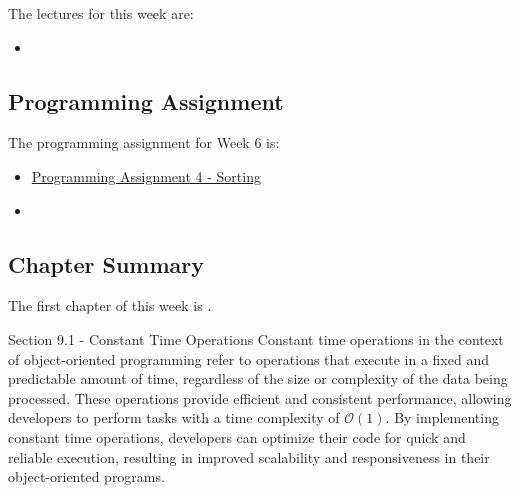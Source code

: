 \noindent The lectures for this week are:

\begin{itemize}
    \item {}
\end{itemize}

\subsection{Programming Assignment}

The programming assignment for Week 6 is:

\begin{itemize}
    \item \href{https://github.com/QuantumCompiler/CU/tree/main/CSPB%202270%20-%20Data%20Structures/CSPB%202270%20-%20Programming%20Assignments/CSPB%202270%20-%20Assignment%204%20-%20Sorting%20Algorithms}{Programming Assignment 4 - Sorting}
    \item {}
\end{itemize}

\subsection{Chapter Summary}

The first chapter of this week is .

\begin{notes}{Section 9.1 - Constant Time Operations}
    Constant time operations in the context of object-oriented programming refer to operations that execute in a fixed and predictable amount of time, regardless of the size or complexity of the data being processed. These operations provide efficient and consistent performance, allowing developers to perform tasks with a time complexity of $\mathcal{O}(1)$. 
    By implementing constant time operations, developers can optimize their code for quick and reliable execution, resulting in improved scalability and responsiveness in their object-oriented programs.
\end{notes}

